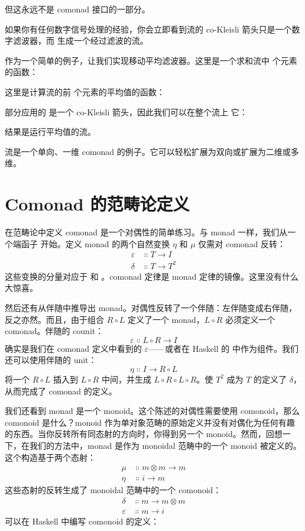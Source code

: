 但这永远不是 comonad 接口的一部分。

如果你有任何数字信号处理的经验，你会立即看到流的 co-Kleisli 箭头只是一个数字滤波器，而  生成一个经过滤波的流。

作为一个简单的例子，让我们实现移动平均滤波器。这里是一个求和流中  个元素的函数：

这里是计算流的前  个元素的平均值的函数：

部分应用的  是一个 co-Kleisli 箭头，因此我们可以在整个流上  它：

结果是运行平均值的流。

流是一个单向、一维 comonad 的例子。它可以轻松扩展为双向或扩展为二维或多维。

\section{Comonad 的范畴论定义}

在范畴论中定义 comonad 是一个对偶性的简单练习。与 monad 一样，我们从一个端函子  开始。定义 monad 的两个自然变换 $\eta$ 和 $\mu$ 仅需对 comonad 反转：
\begin{align*}
  \varepsilon & \Colon T \to I   \\
  \delta      & \Colon T \to T^2
\end{align*}
这些变换的分量对应于  和 。comonad 定律是 monad 定律的镜像。这里没有什么大惊喜。

然后还有从伴随中推导出 monad。对偶性反转了一个伴随：左伴随变成右伴随，反之亦然。而且，由于组合 $R \circ L$ 定义了一个 monad，$L \circ R$ 必须定义一个 comonad。伴随的 counit：
\[\varepsilon \Colon L \circ R \to I\]
确实是我们在 comonad 定义中看到的 $\varepsilon$——或者在 Haskell 的  中作为组件。我们还可以使用伴随的 unit：
\[\eta \Colon I \to R \circ L\]
将一个 $R \circ L$ 插入到 $L \circ R$ 中间，并生成 $L \circ R \circ L \circ R$。使 $T^2$ 成为 $T$ 的定义了 $\delta$，从而完成了 comonad 的定义。

我们还看到 monad 是一个 monoid。这个陈述的对偶性需要使用 comonoid，那么 comonoid 是什么？monoid 作为单对象范畴的原始定义并没有对偶化为任何有趣的东西。当你反转所有同态射的方向时，你得到另一个 monoid。然而，回想一下，在我们的方法中，monad 是作为 monoidal 范畴中的一个 monoid 被定义的。这个构造基于两个态射：
\begin{align*}
  \mu  & \Colon m \otimes m \to m \\
  \eta & \Colon i \to m
\end{align*}
这些态射的反转生成了 monoidal 范畴中的一个 comonoid：
\begin{align*}
  \delta      & \Colon m \to m \otimes m \\
  \varepsilon & \Colon m \to i
\end{align*}
可以在 Haskell 中编写 comonoid 的定义：

